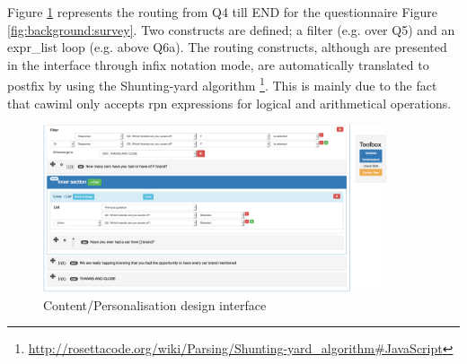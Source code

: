	Figure \ref{fig:impl:designInterface2} represents the routing from Q4 till END for the questionnaire Figure \ref{fig:background:survey}. Two constructs are defined; a filter (e.g. over Q5) and an expr\_list loop (e.g. above Q6a). The routing constructs, although are presented in the interface through infix notation mode, are automatically translated to postfix by using the Shunting-yard algorithm \footnote{\url{http://rosettacode.org/wiki/Parsing/Shunting-yard_algorithm\#JavaScript}}. This is mainly due to the fact that \gls{cawiml} only accepts \gls{rpn} expressions for logical and arithmetical operations.

	\begin{figure}[h]
	\centering
	\includegraphics[width=0.90\textwidth]{implementation/img/design_2}
	\caption{Content/Personalisation design interface}
	\label{fig:impl:designInterface2}
	\end{figure}
